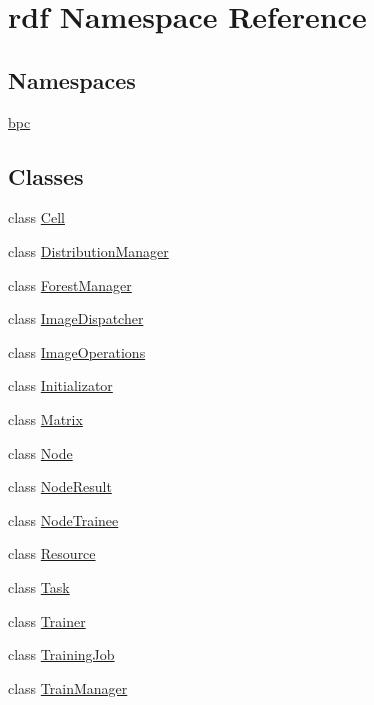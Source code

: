 \hypertarget{namespacerdf}{}\section{rdf Namespace Reference}
\label{namespacerdf}
\subsection*{Namespaces}
\begin{DoxyCompactItemize}
\item 
 \hyperlink{namespacerdf_1_1bpc}{bpc}
\end{DoxyCompactItemize}
\subsection*{Classes}
\begin{DoxyCompactItemize}
\item 
class \hyperlink{classrdf_1_1Cell}{Cell}
\item 
class \hyperlink{classrdf_1_1DistributionManager}{Distribution\+Manager}
\item 
class \hyperlink{classrdf_1_1ForestManager}{Forest\+Manager}
\item 
class \hyperlink{classrdf_1_1ImageDispatcher}{Image\+Dispatcher}
\item 
class \hyperlink{classrdf_1_1ImageOperations}{Image\+Operations}
\item 
class \hyperlink{classrdf_1_1Initializator}{Initializator}
\item 
class \hyperlink{classrdf_1_1Matrix}{Matrix}
\item 
class \hyperlink{classrdf_1_1Node}{Node}
\item 
class \hyperlink{classrdf_1_1NodeResult}{Node\+Result}
\item 
class \hyperlink{classrdf_1_1NodeTrainee}{Node\+Trainee}
\item 
class \hyperlink{classrdf_1_1Resource}{Resource}
\item 
class \hyperlink{classrdf_1_1Task}{Task}
\item 
class \hyperlink{classrdf_1_1Trainer}{Trainer}
\item 
class \hyperlink{classrdf_1_1TrainingJob}{Training\+Job}
\item 
class \hyperlink{classrdf_1_1TrainManager}{Train\+Manager}
\end{DoxyCompactItemize}
